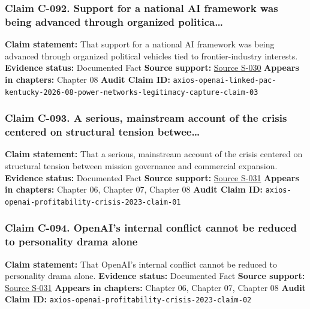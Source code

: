 \documentclass[
  american,
  11pt,
  letterpaper,
]{article}
\begin{document}
\subsubsection{Claim C-092. Support for a national AI framework was
being advanced through organized
politica\ldots{}}\label{claim-c-092-support-for-a-national-ai-framework-was-being-advanced-through-organized-politica}

\textbf{Claim statement:} That support for a national AI framework was
being advanced through organized political vehicles tied to
frontier-industry interests. \textbf{Evidence status:} Documented Fact
\textbf{Source support:}
\hyperref[source-s-030-openai-linked-pac-doubles-down-in-kentucky]{Source
S-030} \textbf{Appears in chapters:} Chapter 08 \textbf{Audit Claim ID:}
\texttt{axios-openai-linked-pac-kentucky-2026-08-power-networks-legitimacy-capture-claim-03}

\subsubsection{Claim C-093. A serious, mainstream account of the crisis
centered on structural tension
betwee\ldots{}}\label{claim-c-093-a-serious-mainstream-account-of-the-crisis-centered-on-structural-tension-betwee}

\textbf{Claim statement:} That a serious, mainstream account of the
crisis centered on structural tension between mission governance and
commercial expansion. \textbf{Evidence status:} Documented Fact
\textbf{Source support:}
\hyperref[source-s-031-how-tensions-over-profitability-at-openai-turned-into-a-full-blown-crisis]{Source
S-031} \textbf{Appears in chapters:} Chapter 06, Chapter 07, Chapter 08
\textbf{Audit Claim ID:}
\texttt{axios-openai-profitability-crisis-2023-claim-01}

\subsubsection{Claim C-094. OpenAI's internal conflict cannot be reduced
to personality drama
alone}\label{claim-c-094-openai-s-internal-conflict-cannot-be-reduced-to-personality-drama-alone}

\textbf{Claim statement:} That OpenAI's internal conflict cannot be
reduced to personality drama alone. \textbf{Evidence status:} Documented
Fact \textbf{Source support:}
\hyperref[source-s-031-how-tensions-over-profitability-at-openai-turned-into-a-full-blown-crisis]{Source
S-031} \textbf{Appears in chapters:} Chapter 06, Chapter 07, Chapter 08
\textbf{Audit Claim ID:}
\texttt{axios-openai-profitability-crisis-2023-claim-02}
\end{document}
